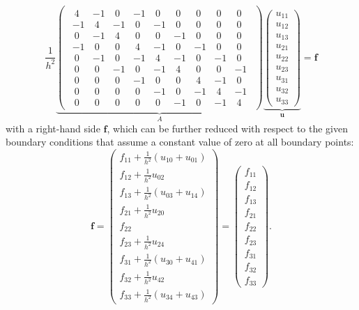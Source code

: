 \begin{equation}
\frac{1}{h^2} \underbrace{ \begin{pmatrix}
\begin{array}{ccc|ccc|ccc}~4&-1&~0&-1&~0&~0&~0&~0&~0\\-1&~4&-1&~0&-1&~0&~0&~0&~0\\~0&-1&~4&~0&~0&-1&~0&~0&~0\\\hline -1&~0&~0&~4&-1&~0&-1&~0&~0\\~0&-1&~0&-1&~4&-1&~0&-1&~0\\~0&~0&-1&~0&-1&~4&~0&~0&-1\\\hline ~0&~0&~0&-1&~0&~0&~4&-1&~0\\~0&~0&~0&~0&-1&~0&-1&~4&-1\\~0&~0&~0&~0&~0&-1&~0&-1&~4\end{array}
	\end{pmatrix}}_{\textstyle A}
\underbrace{
	\begin{pmatrix}
	u_{11} \\ u_{12} \\ u_{13} \\ u_{21} \\ u_{22} \\ u_{23} \\ u_{31} \\ u_{32} \\ u_{33}
\end{pmatrix}}_{\textstyle{\bm{u}}} = \bm f
\label{eq:2D-poisson-assembled-matrix}
\end{equation}
with a right-hand side $\bm f$, which can be further reduced with respect to the given boundary conditions that assume a constant value of zero at all boundary points:
\begin{equation}
\bm f = \begin{pmatrix}
		f_{11} + \frac{1}{h^2} (u_{10} + u_{01}) \\f_{12} + \frac{1}{h^2} u_{02} \\ f_{13} + \frac{1}{h^2} (u_{03} + u_{14})  \\ f_{21} + \frac{1}{h^2} u_{20} \\ f_{22} \\ f_{23} + \frac{1}{h^2} u_{24} \\ f_{31} + \frac{1}{h^2} (u_{30} + u_{41}) \\ f_{32} + \frac{1}{h^2} u_{42} \\ f_{33} + \frac{1}{h^2} (u_{34} + u_{43})
\end{pmatrix} = \begin{pmatrix}
f_{11} \\
f_{12} \\ 
f_{13} \\ 
f_{21} \\ 
f_{22} \\
f_{23} \\
f_{31} \\ 
f_{32} \\
f_{33}
\end{pmatrix}.
\label{eq:2D-poisson-assembled-rhs}
\end{equation}
